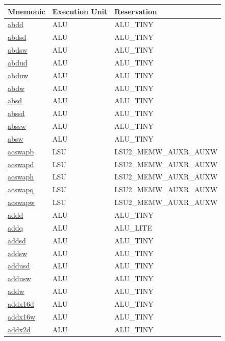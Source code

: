 \label{sec:instructions_index}
\begin{small}
\begin{longtable}[l]{l l l}
\textbf{Mnemonic} & \textbf{Execution Unit} & \textbf{Reservation} \\
\endhead
\hyperlink{lvx.abdd}{abdd} & ALU & ALU\_TINY \\ 
\hyperlink{lvx.abdsd}{abdsd} & ALU & ALU\_TINY \\ 
\hyperlink{lvx.abdsw}{abdsw} & ALU & ALU\_TINY \\ 
\hyperlink{lvx.abdud}{abdud} & ALU & ALU\_TINY \\ 
\hyperlink{lvx.abduw}{abduw} & ALU & ALU\_TINY \\ 
\hyperlink{lvx.abdw}{abdw} & ALU & ALU\_TINY \\ 
\hyperlink{lvx.absd}{absd} & ALU & ALU\_TINY \\ 
\hyperlink{lvx.abssd}{abssd} & ALU & ALU\_TINY \\ 
\hyperlink{lvx.abssw}{abssw} & ALU & ALU\_TINY \\ 
\hyperlink{lvx.absw}{absw} & ALU & ALU\_TINY \\ 
\hyperlink{lvx.acswapb}{acswapb} & LSU & LSU2\_MEMW\_AUXR\_AUXW \\ 
\hyperlink{lvx.acswapd}{acswapd} & LSU & LSU2\_MEMW\_AUXR\_AUXW \\ 
\hyperlink{lvx.acswaph}{acswaph} & LSU & LSU2\_MEMW\_AUXR\_AUXW \\ 
\hyperlink{lvx.acswapq}{acswapq} & LSU & LSU2\_MEMW\_AUXR\_AUXW \\ 
\hyperlink{lvx.acswapw}{acswapw} & LSU & LSU2\_MEMW\_AUXR\_AUXW \\ 
\hyperlink{lvx.addd}{addd} & ALU & ALU\_TINY \\ 
\hyperlink{lvx.addq}{addq} & ALU & ALU\_LITE \\ 
\hyperlink{lvx.addsd}{addsd} & ALU & ALU\_TINY \\ 
\hyperlink{lvx.addsw}{addsw} & ALU & ALU\_TINY \\ 
\hyperlink{lvx.addusd}{addusd} & ALU & ALU\_TINY \\ 
\hyperlink{lvx.addusw}{addusw} & ALU & ALU\_TINY \\ 
\hyperlink{lvx.addw}{addw} & ALU & ALU\_TINY \\ 
\hyperlink{lvx.addx16d}{addx16d} & ALU & ALU\_TINY \\ 
\hyperlink{lvx.addx16w}{addx16w} & ALU & ALU\_TINY \\ 
\hyperlink{lvx.addx2d}{addx2d} & ALU & ALU\_TINY \\ 

\end{longtable}
\end{small}
